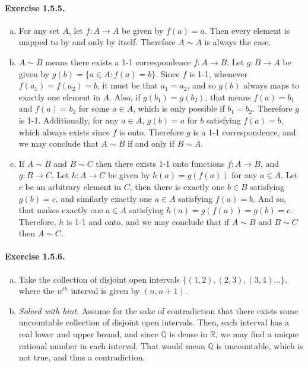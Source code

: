 \documentclass{article}
\newcommand{\R}{\mathbb{R}}
\newcommand{\Q}{\mathbb{Q}}
\begin{document}
\paragraph{Exercise 1.5.5.}
\begin{enumerate}[(a)]
    \item For any set $A$, let $f: A\to A$ be given by $f(a) = a$. Then every element is mapped to by and only by itself. Therefore $A \sim A$ is always the case.
    \item $A\sim B$ means there exists a 1-1 correspondence $f: A\to B$. Let $g:B\to A$ be given by $g(b) = \{ a\in A : f(a) = b\}$. Since $f$ is 1-1, whenever $f(a_1) = f(a_2) = b$, it must be that $a_1 = a_2$, and so $g(b)$ always maps to exactly one element in $A$. Also, if $g(b_1) = g(b_2)$, that means $f(a)=b_1$ and $f(a)=b_2$ for some $a\in A$, which is only possible if $b_1 = b_2$. Therefore $g$ is 1-1. Additionally, for any $a \in A$, $g(b)=a$ for $b$ satisfying $f(a)=b$, which always exists since $f$ is onto. Therefore $g$ is a 1-1 correspondence, and we may conclude that $A\sim B$ if and only if $B \sim A$.
    \item If $A\sim B$ and $B\sim C$ then there exists 1-1 onto functions $f: A\to B$, and $g: B\to C$. Let $h:A\to C$ be given by $h(a) = g(f(a))$ for any $a \in A$. Let $c$ be an arbitrary element in $C$, then there is exactly one $b\in B$ satisfying $g(b) = c$, and similarly exactly one $a\in A$ satisfying $f(a) = b$. And so, that makes exactly one $a\in A$ satisfying $h(a) = g(f(a)) = g(b) = c$. Therefore, $h$ is 1-1 and onto, and we may conclude that if $A\sim B$ and $B\sim C$ then $A\sim C$.
\end{enumerate}

\paragraph{Exercise 1.5.6.}
\begin{enumerate}[(a)]
    \item Take the collection of disjoint open intervals $\{ (1,2), (2,3), (3,4) \ldots \}$, where the $n^{th}$ interval is given by $(n,n+1)$.
    \item \textit{Solved with hint.} Assume for the sake of contradiction that there exists some uncountable collection of disjoint open intervals. Then, each interval has a real lower and upper bound, and since $\Q$ is dense in $\R$, we may find a unique rational number in each interval. That would mean $\Q$ is uncountable, which is not true, and thus a contradiction.
\end{enumerate}
\end{document}
